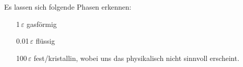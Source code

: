 Es lassen sich folgende Phasen erkennen:
\begin{enumerate}
\item[1$\,\varepsilon$] gasförmig \\
\item[0.01$\,\varepsilon$] flüssig \\
\item[100$\,\varepsilon$] fest/kristallin, wobei uns das physikalisch nicht sinnvoll erscheint.\\
\end{enumerate}

\begin{comment}
\newpage
\begin{landscape}
	\begin{figure}
		\OverfullCenter{\texttt{[image: ../Abgabe/a3\_savedata.pdf]}}
		\caption{Graphische Darstellung der Ergebnisse von Aufgabe 1d: Plots der Energien ($T_0$ = 1$\,\varepsilon$)}
		\label{fig:energie1}
	\end{figure}
\end{landscape} 

\begin{landscape}
	\begin{figure}
		\OverfullCenter{\texttt{[image: ../Abgabe/a3\_paar.pdf]}}
		\caption{Graphische Darstellung der Ergebnisse von Aufgabe 1d: Plots der Paarkorrelationsfunktion ($T_0$ = 1$\,\varepsilon$)}
		\label{fig:korr1}
	\end{figure}
\end{landscape} 

\begin{landscape}
	\begin{figure}
		\OverfullCenter{\texttt{[image: ../Abgabe/a3\_savedata.pdf]}}
		\caption{Graphische Darstellung der Ergebnisse von Aufgabe 1d: Plots der Energien ($T_0$ = 0.01$\,\varepsilon$)}
		\label{fig:energie2}
	\end{figure}
\end{landscape} 

\begin{landscape}
	\begin{figure}
		\OverfullCenter{\texttt{[image: ../Abgabe/a3\_paar.pdf]}}
		\caption{Graphische Darstellung der Ergebnisse von Aufgabe 1d: Plots der Paarkorrelationsfunktion($T_0$ = 0.01$\,\varepsilon$)}
		\label{fig:korr2}
	\end{figure}
\end{landscape} 


\end{comment}
